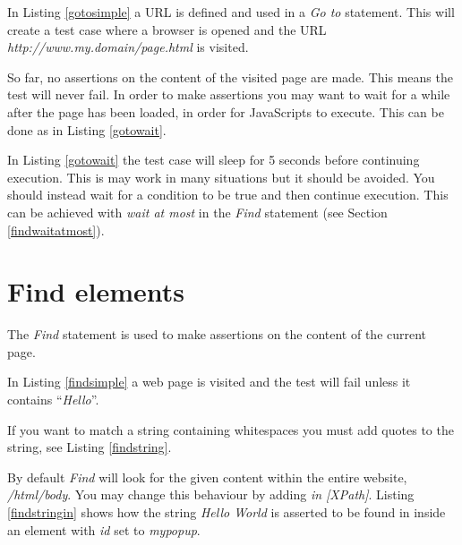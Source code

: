 \documentclass[a4paper,11pt]{kth-mag}
\begin{document}
In Listing \ref{gotosimple} a URL is defined and used in a \textit{Go to} statement. This will create a test case where a browser is opened and the URL \textit{http://www.my.domain/page.html} is visited.


So far, no assertions on the content of the visited page are made. This means the test will never fail. In order to make assertions you may want to wait for a while after the page has been loaded, in order for JavaScripts to execute. This can be done as in Listing \ref{gotowait}.

\lstset{basicstyle=\footnotesize, caption=Go to statement with wait, label=gotowait, numbers=left, frame=single, captionpos=b}


In Listing \ref{gotowait} the test case will sleep for 5 seconds before continuing execution. This is may work in many situations but it should be avoided. You should instead wait for a condition to be true and then continue execution. This can be achieved with \textit{wait at most} in the \textit{Find} statement (see Section \ref{findwaitatmost}).


\section{Find elements}
The \textit{Find} statement is used to make assertions on the content of the current page.

\lstset{basicstyle=\footnotesize, caption=Find statement, label=findsimple, numbers=left, frame=single, captionpos=b}


In Listing \ref{findsimple} a web page is visited and the test will fail unless it contains ``\textit{Hello}''.

If you want to match a string containing whitespaces you must add quotes to the string, see Listing \ref{findstring}.

\lstset{basicstyle=\footnotesize, caption=Find statement with spaces, label=findstring, numbers=left, frame=single, captionpos=b}


By default \textit{Find} will look for the given content within the entire website, \textit{/html/body}. You may change this behaviour by adding \textit{in [XPath]}. Listing \ref{findstringin} shows how the string \textit{Hello World} is asserted to be found in inside an element with \textit{id} set to \textit{mypopup}. 
\end{document}
